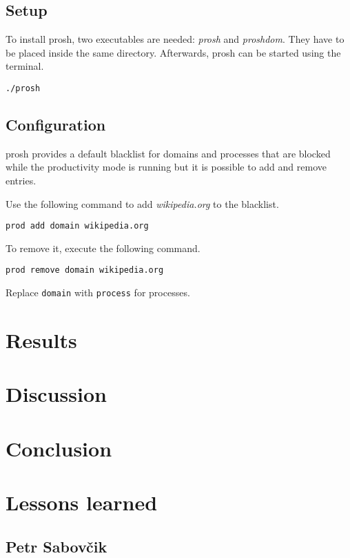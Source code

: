 \documentclass{article}
\begin{document}
\subsection{Setup}

To install prosh, two executables are needed: \textit{prosh} and \textit{proshdom}. They have to be placed inside the same directory. Afterwards, prosh can be started using the terminal.
\begin{lstlisting}[numbers=none]
./prosh
\end{lstlisting}

\subsection{Configuration}

prosh provides a default blacklist for domains and processes that are blocked while the productivity mode is running but it is possible to add and remove entries.

Use the following command to add \textit{wikipedia.org} to the blacklist.
\begin{lstlisting}[numbers=none]
prod add domain wikipedia.org
\end{lstlisting}

To remove it, execute the following command.
\begin{lstlisting}[numbers=none]
prod remove domain wikipedia.org
\end{lstlisting}

Replace \texttt{domain} with \texttt{process} for processes.

\section{Results}

\section{Discussion}

\section{Conclusion}

\section{Lessons learned}
\subsection{Petr Sabovčik}
\end{document}
